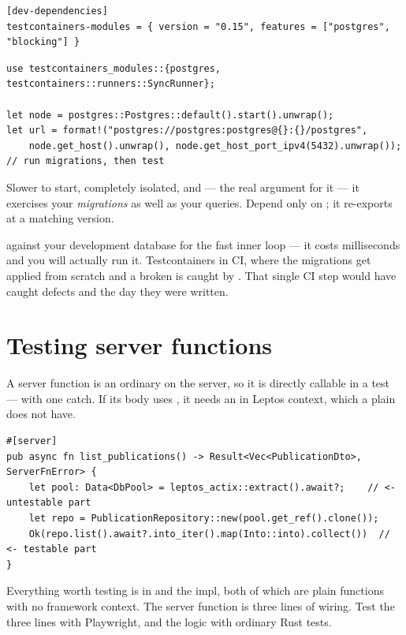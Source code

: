 \begin{lstlisting}[style=toml]
[dev-dependencies]
testcontainers-modules = { version = "0.15", features = ["postgres", "blocking"] }
\end{lstlisting}

\begin{lstlisting}[style=rs]
use testcontainers_modules::{postgres, testcontainers::runners::SyncRunner};

let node = postgres::Postgres::default().start().unwrap();
let url = format!("postgres://postgres:postgres@{}:{}/postgres",
    node.get_host().unwrap(), node.get_host_port_ipv4(5432).unwrap());
// run migrations, then test
\end{lstlisting}

Slower to start, completely isolated, and --- the real argument for it --- it exercises your
\emph{migrations} as well as your queries. Depend only on ; it
re-exports  at a matching version.

\begin{pattern}
 against your development database for the fast inner loop --- it costs
milliseconds and you will actually run it. Testcontainers in CI, where the migrations get applied
from scratch and a broken  is caught by . That single
CI step would have caught defects  and  the day they were written.
\end{pattern}

\section{Testing server functions}

A server function is an ordinary  on the server, so it is directly callable in a
test --- with one catch. If its body uses , it needs an
 in Leptos context, which a plain \code{\#[test]} does not have.

\begin{pattern}
\begin{lstlisting}[style=rs]
#[server]
pub async fn list_publications() -> Result<Vec<PublicationDto>, ServerFnError> {
    let pool: Data<DbPool> = leptos_actix::extract().await?;    // <- untestable part
    let repo = PublicationRepository::new(pool.get_ref().clone());
    Ok(repo.list().await?.into_iter().map(Into::into).collect())  // <- testable part
}
\end{lstlisting}
Everything worth testing is in  and the  impl, both of which are
plain functions with no framework context. The server function is three lines of wiring. Test the
three lines with Playwright, and the logic with ordinary Rust tests.
\end{pattern}

